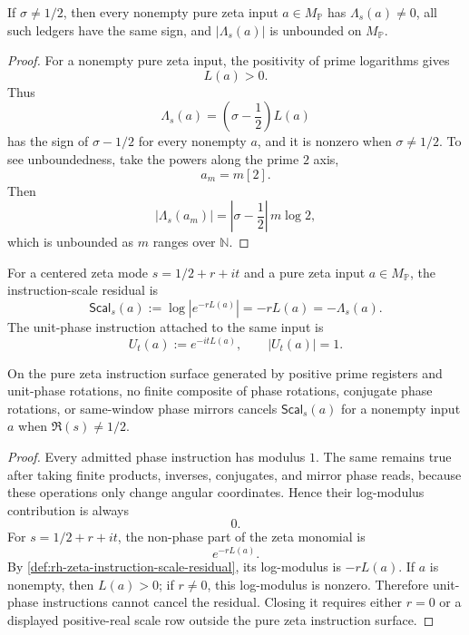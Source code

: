 \begin{theorem}
\label{thm:rh-offhalf-scaling-ledgers-samesigned-unbounded}
If $\sigma\ne1/2$, then every nonempty pure zeta input
$a\in M_{\mathbb P}$ has $\Lambda_s(a)\ne0$, all such ledgers have the
same sign, and $|\Lambda_s(a)|$ is unbounded on $M_{\mathbb P}$.
\end{theorem}

\begin{proof}
For a nonempty pure zeta input, the positivity of prime logarithms gives
$$
L(a)>0.
$$
Thus
$$
\Lambda_s(a)=(\sigma-\frac12)L(a)
$$
has the sign of $\sigma-1/2$ for every nonempty $a$, and it is nonzero
when $\sigma\ne1/2$.  To see unboundedness, take the powers along the
prime $2$ axis,
$$
a_m=m[2].
$$
Then
$$
|\Lambda_s(a_m)|
=
|\sigma-\frac12|\,m\log2,
$$
which is unbounded as $m$ ranges over $\mathbb N$.
\end{proof}

\begin{definition}
\label{def:rh-zeta-instruction-scale-residual}
For a centered zeta mode $s=1/2+r+it$ and a pure zeta input
$a\in M_{\mathbb P}$, the instruction-scale residual is
$$
\mathsf{Scal}_s(a)
:=
\log\left|e^{-rL(a)}\right|
=
-rL(a)
=
-\Lambda_s(a).
$$
The unit-phase instruction attached to the same input is
$$
U_t(a):=e^{-itL(a)},
\qquad
|U_t(a)|=1.
$$
\end{definition}

\begin{theorem}
\label{thm:rh-offhalf-scaling-cancellation-not-zeta-instruction}
On the pure zeta instruction surface generated by positive prime
registers and unit-phase rotations, no finite composite of phase
rotations, conjugate phase rotations, or same-window phase mirrors
cancels $\mathsf{Scal}_s(a)$ for a nonempty input $a$ when
$\Re(s)\ne1/2$.
\end{theorem}

\begin{proof}
Every admitted phase instruction has modulus $1$.  The same remains true
after taking finite products, inverses, conjugates, and mirror phase
reads, because these operations only change angular coordinates.  Hence
their log-modulus contribution is always
$$
0.
$$
For $s=1/2+r+it$, the non-phase part of the zeta monomial is
$$
e^{-rL(a)}.
$$
By \autoref{def:rh-zeta-instruction-scale-residual}, its log-modulus is
$-rL(a)$.  If $a$ is nonempty, then $L(a)>0$; if $r\ne0$, this
log-modulus is nonzero.  Therefore unit-phase instructions cannot cancel
the residual.  Closing it requires either $r=0$ or a displayed
positive-real scale row outside the pure zeta instruction surface.
\end{proof}

